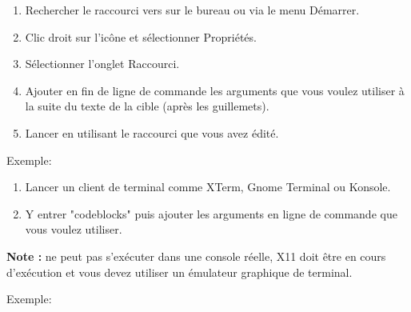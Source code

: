 \begin{enumerate}[noitemsep] 
\item Rechercher le raccourci vers \codeblocks sur le bureau ou via le menu Démarrer.
\item Clic droit sur l'icône et sélectionner Propriétés.
\item Sélectionner l'onglet Raccourci.
\item Ajouter en fin de ligne de commande les arguments que vous voulez utiliser à la suite du texte de la cible (après les guillemets).
\item Lancer \codeblocks en utilisant le raccourci que vous avez édité.
\end{enumerate}

Exemple:\\

\begin{enumerate}[noitemsep] 
\item Lancer un client de terminal comme XTerm, Gnome Terminal ou Konsole.
\item Y entrer "codeblocks" puis ajouter les arguments en ligne de commande que vous voulez utiliser.
\end{enumerate}
\textbf{Note :} \codeblocks ne peut pas s'exécuter dans une console réelle, X11 doit être en cours d'exécution et vous devez utiliser un émulateur graphique de terminal.

Exemple:\\

